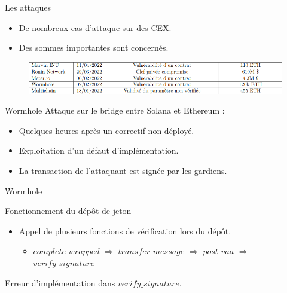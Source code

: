 \begin{frame}{Les attaques}
    \begin{itemize}
        \item De nombreux cas d'attaque sur des CEX\footnotemark.
        \item Des sommes importantes sont concernés.
    \end{itemize}
    \begin{figure}
        \centering
        \includegraphics[scale = 0.45]{img/attaques.png}
        \label{fig:my_label2}
    \end{figure}
\end{frame}

\begin{frame}{Wormhole}
    Attaque sur le bridge entre Solana et Ethereum :
    \begin{itemize}
        \item Quelques heures après un correctif non déployé.
        \item Exploitation d'un défaut d'implémentation.
        \item La transaction de l'attaquant est signée par les gardiens.
        
    \end{itemize}
\end{frame}
\begin{frame}{Wormhole}
    \begin{block}{Fonctionnement du dépôt de jeton}
        \begin{itemize}
            \item Appel de plusieurs fonctions de vérification lors du dépôt.
            \begin{itemize}
                \item $complete\_wrapped$ $\Rightarrow$ 
                 $transfer\_message$
                 $\Rightarrow$  $post\_vaa$
                 $\Rightarrow$  $verify\_signature$
            \end{itemize}
        \end{itemize}
        Erreur d'implémentation dans $verify\_signature$.
    \end{block}
\end{frame}

